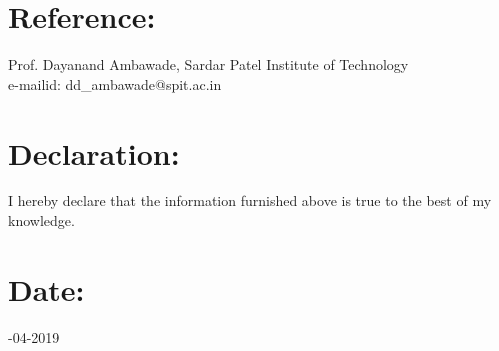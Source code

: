 \documentclass{article}
\begin{document}
\section*{\normalsize{\textbf{Reference:}}}
\noindent 
Prof. Dayanand Ambawade, Sardar Patel Institute of Technology \\e-mailid: dd\_ambawade@spit.ac.in


\section*{\textbf{\normalsize{Declaration:}}}
\noindent
 I hereby declare that the information furnished above is true to the best of my knowledge.


\section*{\textbf{\normalsize{Date:}}}
-04-2019 
\end{document}
